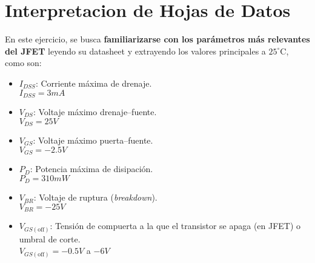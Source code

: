 \chapter{Interpretacion de Hojas de Datos}
En este ejercicio, se busca \textbf{familiarizarse con los parámetros más relevantes del JFET} 
leyendo su datasheet y extrayendo los valores principales a $25^\circ$C, como son:  

\begin{itemize}
    \item $I_{DSS}$: Corriente máxima de drenaje. \\ $I_{DSS} = 3mA$ 
    \item $V_{DS}$: Voltaje máximo drenaje–fuente. \\ $V_{DS} = 25V$
    \item $V_{GS}$: Voltaje máximo puerta–fuente.  \\ $V_{GS} = -2.5V$
    \item $P_D$: Potencia máxima de disipación.  \\ $P_D = 310 mW$
    \item $V_{BR}$: Voltaje de ruptura (\textit{breakdown}). \\ $V_{BR} = -25V$
    \item $V_{GS(\text{off})}$: Tensión de compuerta a la que el transistor se apaga 
    (en JFET) o umbral de corte. \\ $V_{GS(\text{off})} = -0.5V$ a $-6V$
\end{itemize}
